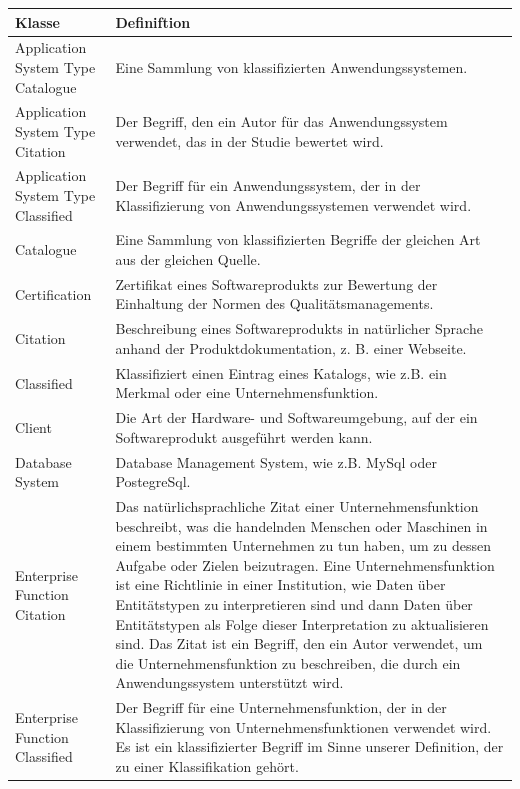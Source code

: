 \clearpage

\begin{longtable}{ | p{} | p{7 cm} | }
\hline
\textbf{Klasse} & \textbf{Definiftion} \\ \hline
\endhead
Application System Type Catalogue & Eine Sammlung von klassifizierten Anwendungssystemen. \\
\hline
Application System Type Citation & Der Begriff, den ein Autor für das Anwendungssystem verwendet, das in der Studie bewertet wird. \\
\hline
Application System Type Classified & Der Begriff für ein Anwendungssystem, der in der Klassifizierung von Anwendungssystemen verwendet wird. \\
\hline
Catalogue & Eine Sammlung von klassifizierten Begriffe der gleichen Art aus der gleichen Quelle. \\
\hline
Certification & Zertifikat eines Softwareprodukts zur Bewertung der Einhaltung der Normen des Qualitätsmanagements. \\
\hline
Citation & Beschreibung eines Softwareprodukts in natürlicher Sprache anhand der Produktdokumentation, z. B. einer Webseite. \\
\hline
Classified & Klassifiziert einen Eintrag eines Katalogs, wie z.B. ein Merkmal oder eine Unternehmensfunktion. \\
\hline
Client & Die Art der Hardware- und Softwareumgebung, auf der ein Softwareprodukt ausgeführt werden kann. \\
\hline
Database System & Database Management System, wie z.B. MySql oder PostegreSql.\\
\hline
Enterprise Function Citation & Das natürlichsprachliche Zitat einer Unternehmensfunktion beschreibt, was die handelnden Menschen oder Maschinen in einem bestimmten Unternehmen zu tun haben, um zu dessen Aufgabe oder Zielen beizutragen. Eine Unternehmensfunktion ist eine Richtlinie in einer Institution, wie Daten über Entitätstypen zu interpretieren sind und dann Daten über Entitätstypen als Folge dieser Interpretation zu aktualisieren sind. Das Zitat ist ein Begriff, den ein Autor verwendet, um die Unternehmensfunktion zu beschreiben, die durch ein Anwendungssystem unterstützt wird. \\
\hline
Enterprise Function Classified & Der Begriff für eine Unternehmensfunktion, der in der Klassifizierung von Unternehmensfunktionen verwendet wird. Es ist ein klassifizierter Begriff im Sinne unserer Definition, der zu einer Klassifikation gehört. \\

\end{longtable}
